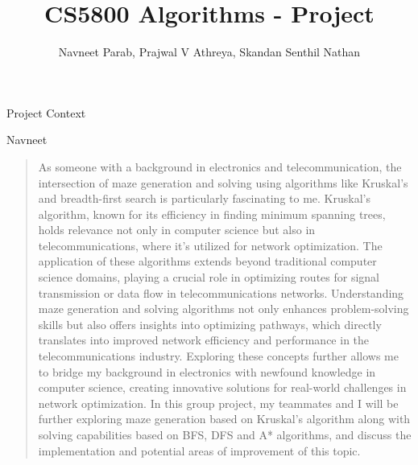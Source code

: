 \documentclass{amsart}
\author{Navneet Parab, Prajwal V Athreya, Skandan Senthil Nathan}
\title{CS5800 Algorithms - Project}
\begin{document}
\maketitle

\begin{section}{Project Context}

    \begin{subsection}{Navneet}
        \begin{quote}
            As someone with a background in electronics and telecommunication, the intersection of maze generation and solving using algorithms like Kruskal's and breadth-first search is particularly fascinating to me. Kruskal's algorithm, known for its efficiency in finding minimum spanning trees, holds relevance not only in computer science but also in telecommunications, where it's utilized for network optimization. The application of these algorithms extends beyond traditional computer science domains, playing a crucial role in optimizing routes for signal transmission or data flow in telecommunications networks. Understanding maze generation and solving algorithms not only enhances problem-solving skills but also offers insights into optimizing pathways, which directly translates into improved network efficiency and performance in the telecommunications industry. Exploring these concepts further allows me to bridge my background in electronics with newfound knowledge in computer science, creating innovative solutions for real-world challenges in network optimization. In this group project, my teammates and I will be further exploring maze generation based on Kruskal's algorithm along with solving capabilities based on BFS, DFS and A* algorithms, and discuss the implementation and potential areas of improvement of this topic.
        \end{quote}
    \end{subsection}


\end{section}
\end{document}
